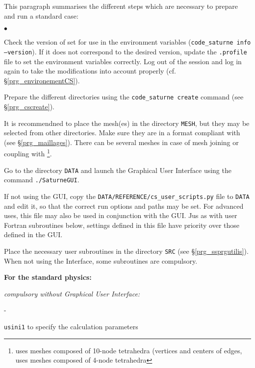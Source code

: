 {{{This paragraph summarises the different steps which are necessary to
prepare and run a standard case:

\begin{list}{$\bullet$}{}

\item Check the version of \CS set for use in the environment variables
(\texttt{code\_saturne~info --version}). If it does not correspond to
the desired version, update the \texttt{.profile} file to set the environment
variables correctly. Log out of the session and
log in again to take the modifications into account properly (cf.
\S\ref{prg_environementCS}).

\item Prepare the different directories using the \texttt{code\_saturne~create}
command (see \S\ref{prg_cscreate}).

\item It is recommendned to place the mesh(es) in the directory \texttt{MESH},
but they may be selected from other directories. Make sure they are
in a format compliant with \CS (see \S\ref{prg_maillages}). There can be
several meshes in case of mesh joining or coupling with
\syrthes\footnote{ uses meshes composed of 10-node tetrahedra (vertices
and centers of edges,  uses meshes composed of 4-node tetrahedra}.

\item Go to the directory \texttt{DATA} and launch the
      Graphical User Interface using the command \texttt{./SaturneGUI}.

\item If not using the GUI, copy the
  \texttt{DATA/REFERENCE/cs\_user\_scripts.py} file to \texttt{DATA} and
  edit it, so that the correct run options and paths may be set. For advanced
  uses, this file may also be used in conjunction with the GUI. Jus as with
  user Fortran subroutines below, settings defined in this file have priority
  over those defined in the GUI.

\item Place the necessary user subroutines in the directory \texttt{SRC} (see
\S\ref{prg_ssprgutilis}). When not using the Interface, some subroutines are
compulsory.

\begin{list}{}{}

\item {\bf For the standard physics:}

    \begin{list}{}{}
        \item {\em compulsory without Graphical User Interface:}
        \begin{list}{-}{}
            \item \texttt{usini1} to specify the calculation parameters


\end{list}
\end{list}
\end{list}
\end{list}}}}
